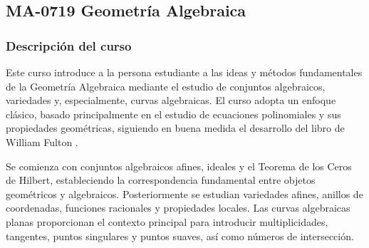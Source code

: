 \newpage
\subsection*{MA-0719 Geometría Algebraica}

\hypertarget{MA0719}{}
\begin{refsection}
\begin{table}[H]
\end{table}

\subsubsection*{Descripción del curso}

Este curso introduce a la persona estudiante a las ideas y métodos fundamentales de la Geometría Algebraica mediante el estudio de conjuntos algebraicos, variedades y, especialmente, curvas algebraicas. El curso adopta un enfoque clásico, basado principalmente en el estudio de ecuaciones polinomiales y sus propiedades geométricas, siguiendo en buena medida el desarrollo del libro de William Fulton \cite{Ful89}.

Se comienza con conjuntos algebraicos afines, ideales y el Teorema de los Ceros de Hilbert, estableciendo la correspondencia fundamental entre objetos geométricos y algebraicos. Posteriormente se estudian variedades afines, anillos de coordenadas, funciones racionales y propiedades locales. Las curvas algebraicas planas proporcionan el contexto principal para introducir multiplicidades, tangentes, puntos singulares y puntos suaves, así como números de intersección.


\end{refsection}
